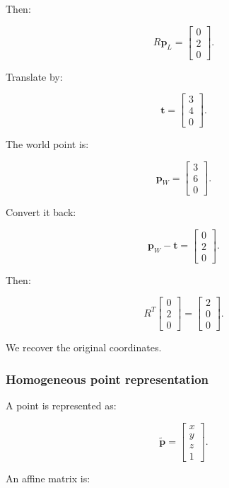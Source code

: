 Then:

\[
 R\mathbf p_L= \begin{bmatrix}0\\2\\0\end{bmatrix}.
\]

Translate by:

\[
 \mathbf t= \begin{bmatrix}3\\4\\0\end{bmatrix}.
\]

The world point is:

\[
 \boxed{ \mathbf p_W= \begin{bmatrix}3\\6\\0\end{bmatrix} }.
\]

Convert it back:

\[
 \mathbf p_W-\mathbf t= \begin{bmatrix}0\\2\\0\end{bmatrix}.
\]

Then:

\[
 R^T \begin{bmatrix}0\\2\\0\end{bmatrix} = \begin{bmatrix}2\\0\\0\end{bmatrix}.
\]

We recover the original coordinates.

\subsubsection{Homogeneous point representation}\label{02-foundations-ii-ch032-homogeneous-point-representation}

A point is represented as:

\[
 \boxed{ \tilde{\mathbf p}= \begin{bmatrix}x\\y\\z\\1\end{bmatrix} }.
\]

An affine matrix is:

